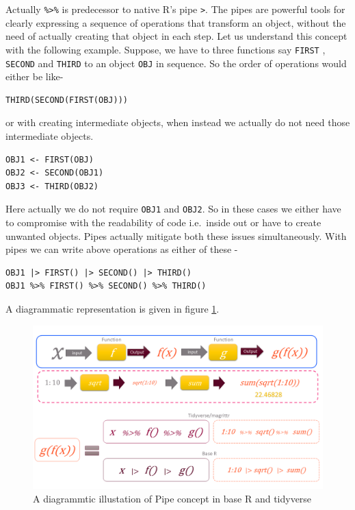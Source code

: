 \documentclass[
]{book}
\begin{document}
Actually \texttt{\%\textgreater{}\%} is predecessor to native R's pipe \texttt{\textbar{}\textgreater{}}. The pipes are powerful tools for clearly expressing a sequence of operations that transform an object, without the need of actually creating that object in each step. Let us understand this concept with the following example. Suppose, we have to three functions say \texttt{FIRST} , \texttt{SECOND} and \texttt{THIRD} to an object \texttt{OBJ} in sequence. So the order of operations would either be like-

\begin{verbatim}
THIRD(SECOND(FIRST(OBJ)))
\end{verbatim}

or with creating intermediate objects, when instead we actually do not need those intermediate objects.

\begin{verbatim}
OBJ1 <- FIRST(OBJ)
OBJ2 <- SECOND(OBJ1)
OBJ3 <- THIRD(OBJ2)
\end{verbatim}

Here actually we do not require \texttt{OBJ1} and \texttt{OBJ2}. So in these cases we either have to compromise with the readability of code i.e.~inside out or have to create unwanted objects. Pipes actually mitigate both these issues simultaneously. With pipes we can write above operations as either of these -

\begin{verbatim}
OBJ1 |> FIRST() |> SECOND() |> THIRD()
OBJ1 %>% FIRST() %>% SECOND() %>% THIRD()
\end{verbatim}

A diagrammatic representation is given in figure \ref{fig:pipe}.

\begin{figure}

{\centering \includegraphics[width=0.99\linewidth]{images/pipe} 

}

\caption{A diagrammtic illustation of Pipe concept in base R and tidyverse}\label{fig:pipe}
\end{figure}
\end{document}
